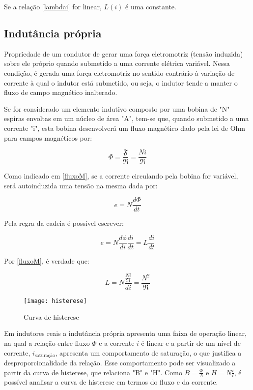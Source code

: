 \documentclass[12pt,fleqn]{book} %
\begin{document}
{Se a relação \ref{lambdai} for linear, $L(i)$ é uma constante.

    \subsection{Indutância própria}
\begin{definition}
Propriedade de um condutor de gerar uma força eletromotriz (tensão induzida) sobre ele próprio quando submetido a uma corrente elétrica variável. Nessa condição, é gerada uma força eletromotriz no sentido contrário à variação de corrente à qual o indutor está submetido, ou seja, o indutor tende a manter o fluxo de campo magnético inalterado.
\end{definition}

Se for considerado um elemento indutivo composto por uma bobina de "N" espiras envoltas em um núcleo de área "A", tem-se que, quando submetido a uma corrente "i", esta bobina desenvolverá um fluxo magnético dado pela lei de Ohm para campos magnéticos por:

\begin{equation}\label{fluxoM}
 \Phi = \frac{\mathfrak{F}}{\mathfrak{R}} = \frac{Ni}{\mathfrak{R}}
\end{equation}    
    
Como indicado em \ref{fluxoM}, se a corrente circulando pela bobina for variável, será autoinduzida uma tensão na mesma dada por:

\begin{equation}
e = N\frac{d\Phi}{dt}
\end{equation}

Pela regra da cadeia é possível escrever:

\begin{equation}
e = N \frac{d\phi}{di}\frac{di}{dt} = L\frac{di}{dt}
\end{equation}

Por \ref{fluxoM}, é verdade que:

\begin{equation}\label{LNR}
L = N\frac{\frac{Ni}{\mathfrak{R}}}{di} = \frac{N^2}{\mathfrak{R}}
\end{equation}   

\begin{figure}[!htbp] \centering\texttt{[image: histerese]}
            \caption{Curva de histerese}\label{histerese} 
        \end{figure}

Em indutores reais a indutância própria apresenta uma faixa de operação linear, na qual a relação entre fluxo $\Phi$ e a corrente $i$ é linear e a partir de um nível de corrente, $i_{\text{saturação}}$, apresenta um comportamento de saturação, o que justifica a desproporcionalidade da relação. Esse comportamento pode ser visualizado a partir da curva de histerese, que relaciona "B" e "H". Como $B=\frac{\Phi}{A}$ e $H = N\frac{i}{l}$, é possível analisar a curva de histerese em termos do fluxo e da corrente. 

}
\end{document}
